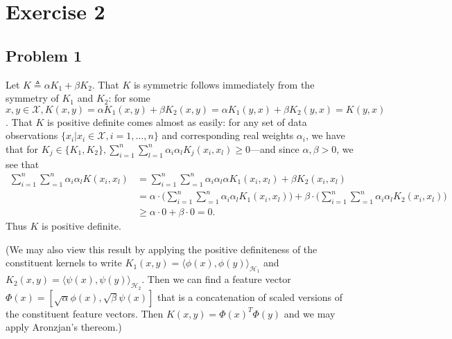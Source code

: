 \documentclass[12pt]{article}
\newenvironment{exercise}[2][Exercise]{\begin{trivlist}
\item[\hskip \labelsep {\bfseries #1}\hskip \labelsep {\bfseries #2.}]}{\end{trivlist}}
\begin{document}
\begin{exercise}{1}
\begin{enumerate}
	\end{enumerate}
\end{exercise}

\section{Exercise 2}
\subsection{Problem 1}
	Let $K \triangleq \alpha K_1 + \beta K_2$. That $K$ is symmetric follows immediately from the symmetry of $K_1$ and $K_2$: for some $x, y \in \mathcal{X}, K(x,y) = \alpha K_1(x,y) + \beta K_2(x,y) = \alpha K_1(y,x) + \beta K_2(y,x) = K(y,x)$. That $K$ is positive definite comes almost as easily: for any set of data observations $\{x_i | x_i \in \mathcal{X}, i=1,\ldots,n\}$ and corresponding real weights $\alpha_i$, we have that for $K_j \in \{K_1, K_2 \}, \sum_{i=1}^n \sum_{l=1}^n \alpha_i \alpha_l K_j(x_i, x_l) \geq 0$---and since $\alpha, \beta > 0$, we see that \begin{align*}\sum_{i=1}^n \sum_{=1}^n \alpha_i \alpha_l K(x_i, x_l) &= \sum_{i=1}^n \sum_{=1}^n \alpha_i \alpha_l \alpha K_1(x_i, x_l) + \beta K_2(x_i, x_l)\\ &= \alpha \cdot \big( \sum_{i=1}^n \sum_{=1}^n \alpha_i \alpha_l K_1(x_i, x_l)\big) + \beta \cdot \big(\sum_{i=1}^n \sum_{=1}^n \alpha_i \alpha_l K_2(x_i, x_l)\big)\\ &\geq \alpha \cdot 0 + \beta \cdot 0 =  0.\end{align*} Thus $K$ is positive definite.

		(We may also view this result by applying the positive definiteness of the constituent kernels to write $K_1(x,y) = \langle \phi(x), \phi(y) \rangle_{\mathcal{H}_1}$ and $K_2(x,y) = \langle \psi(x), \psi(y) \rangle_{\mathcal{H}_2}$. Then we can find a feature vector $\Phi(x) = [\sqrt{\alpha}\phi(x), \sqrt{\beta}\psi(x)]$ that is a concatenation of scaled versions of the constituent feature vectors. Then $K(x,y) = \Phi(x)^T\Phi(y)$ and we may apply Aronzjan's thereom.)  	
\end{document}
